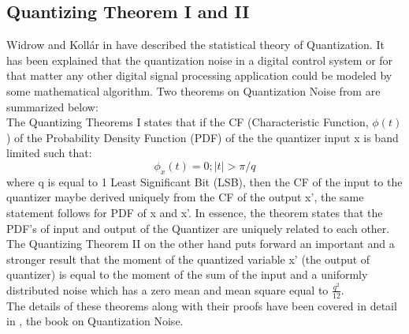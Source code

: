 \documentclass[a4paper,12pt]{article}
\begin{document}
\subsection{Quantizing Theorem I and II} Widrow and Koll\'ar in \cite{Kollar} have described the statistical theory of Quantization. It has been explained that the quantization noise in a digital control system or for that matter any other digital signal processing application could be modeled by some mathematical algorithm. Two theorems on Quantization Noise from \cite{Kollar} are summarized below:\\
The Quantizing Theorems I states that if the CF (Characteristic Function, $\phi(t)$) of the Probability Density Function (PDF) of the the quantizer input x is band limited such that:
	\begin{equation}
		\phi_x(t) = 0 ; |t| >\pi/q  
	\end{equation}
where q is equal to 1 Least Significant Bit (LSB), then the CF of the input to the quantizer maybe derived uniquely from the CF of the output x', the same statement follows for PDF of x and x'. In essence, the theorem states that the PDF's of input and output of the Quantizer are uniquely related to each other.\\
The Quantizing Theorem II on the other hand puts forward an important and a stronger result that the moment of the quantized variable x' (the output of quantizer) is equal to the moment of the sum of the input and a uniformly distributed noise which has a zero mean and mean square equal to $\frac{q^{2}}{12}$. \\
The details of these theorems along with their proofs have been covered in detail in \cite{Kollar}, the book on Quantization Noise.
\end{document}

